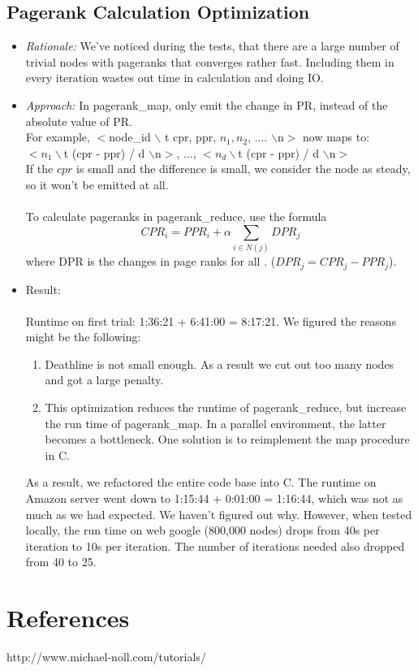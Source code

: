 \documentclass[12pt]{article}
\begin{document}
\subsection{Pagerank Calculation Optimization}
\begin{itemize}
\item \emph{Rationale:} 
We've noticed during the tests, that there are a large number of trivial nodes with pageranks that converges rather fast. Including them in every iteration wastes out time in calculation and doing IO.
\item  \emph{Approach:} 
In pagerank\_map, only emit the change in PR, instead of the absolute value of PR.  \\
For example,  $<$node\_id $\backslash$ t cpr, ppr, $n_1, n_2$, .... $\backslash$n$>$
now maps to:\\
$<n_1 \backslash$t  (cpr - ppr) / d $\backslash$n$>$,  ..., $<n_d \backslash$t  (cpr - ppr) / d  $\backslash$n$>$ \\
If the $cpr$ is small and the difference is small, we consider the node as steady, so it won't be emitted at all. \\\\
To calculate pageranks in pagerank\_reduce, use the formula 
\[CPR_i = PPR_i + \alpha\sum_{i \in N(j)} DPR_j\]
where DPR is the changes in page ranks for all . ($DPR_j = CPR_j - PPR_j$).

\item Result:\\\\
Runtime on first trial: 1:36:21  +  6:41:00  =  8:17:21. We figured the reasons might be the following:
\begin{enumerate}
\item Deathline is not small enough. As a result we cut out too many nodes and got a large penalty. 
\item This optimization reduces the runtime of pagerank\_reduce, but increase the run time of pagerank\_map. In a parallel environment, the latter becomes a bottleneck. One solution is to reimplement the map procedure in C.
\end{enumerate}
As a result, we refactored the entire code base into C.  The runtime on Amazon server went down to  1:15:44  +  0:01:00  =  1:16:44, which was not as much as we had expected. We haven't figured out why. However, when tested locally, the run time on web google (800,000 nodes) drops from 40s per iteration to 10s per iteration. The number of iterations needed also dropped from 40 to 25.\\

\end{itemize}

\section{References}
http://www.michael-noll.com/tutorials/
\end{document}
